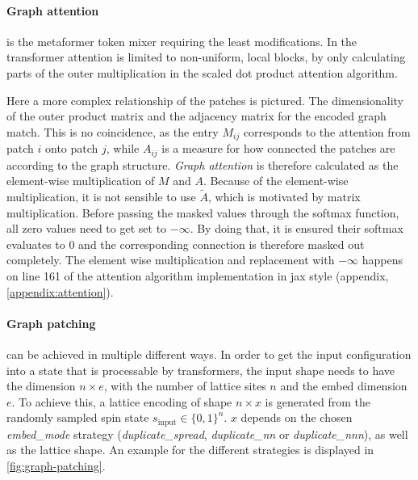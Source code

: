 \paragraph{Graph attention} is the metaformer token mixer requiring the least modifications.
In \cite{swinTransformerPaper} the transformer attention is limited to non-uniform, local blocks, by only calculating parts of the outer multiplication in the scaled dot product attention algorithm. %

Here a more complex relationship of the patches is pictured. 
The dimensionality of the outer product matrix and the adjacency matrix for the encoded graph match. %
This is no coincidence, as the entry $M_{ij}$ corresponds to the attention from patch $i$ onto patch $j$, while $A_{ij}$ is a measure for how \glqq connected\grqq{} the patches are according to the graph structure.
\emph{Graph attention} is therefore calculated as the element-wise multiplication of $M$ and $A$.
Because of the element-wise multiplication, it is not sensible to use $\tilde{A}$, which is motivated by matrix multiplication.
Before passing the masked values through the softmax function, all zero values need to get set to $-\infty$.
By doing that, it is ensured their softmax evaluates to 0 and the corresponding connection is therefore masked out completely.
The element wise multiplication and replacement with $-\infty$ happens on line 161 of the attention algorithm implementation in jax style (appendix, \ref{appendix:attention}).

\paragraph{Graph patching} can be achieved in multiple different ways.
In order to get the input configuration into a state that is processable by transformers, the input shape needs to have the dimension $n \times e$, with the number of lattice sites $n$ and the embed dimension $e$.
To achieve this, a lattice encoding of shape $n \times x$ is generated from the randomly sampled spin state $s_\mathrm{input} \in \{0,1\}^n$.
$x$ depends on the chosen \emph{embed\_mode} strategy (\emph{duplicate\_spread}, \emph{duplicate\_nn} or \emph{duplicate\_nnn}), as well as the lattice shape. 
An example for the different strategies is displayed in \autoref{fig:graph-patching}.


